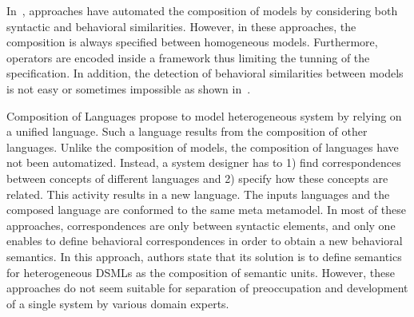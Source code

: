 In~\cite{compostatechartsbib,weavingbib}, approaches have automated the composition of models by considering both syntactic and behavioral similarities. However, in these approaches, the composition is always specified between homogeneous models. Furthermore, operators are encoded inside a framework thus limiting the tunning of the specification. In addition, the detection of behavioral similarities between models is not easy or sometimes impossible as shown in~\cite{?}. 

Composition of Languages propose to model heterogeneous system by relying on a unified language. Such a language results from the composition of other languages. Unlike the composition of models, the composition of languages have not been automatized. Instead, a system designer has to 1) find correspondences between concepts of different languages and 2) specify how these concepts are related. This activity results in a new language. The inputs languages and the composed language are conformed to the same meta metamodel. In most of these approaches, correspondences are only between syntactic elements, and only one enables to define behavioral correspondences in order to obtain a new behavioral semantics. In this approach, authors state that its solution is to define semantics for heterogeneous DSMLs as the composition of semantic units. However, these approaches do not seem suitable for separation of preoccupation and development of a single system by various domain experts. 
